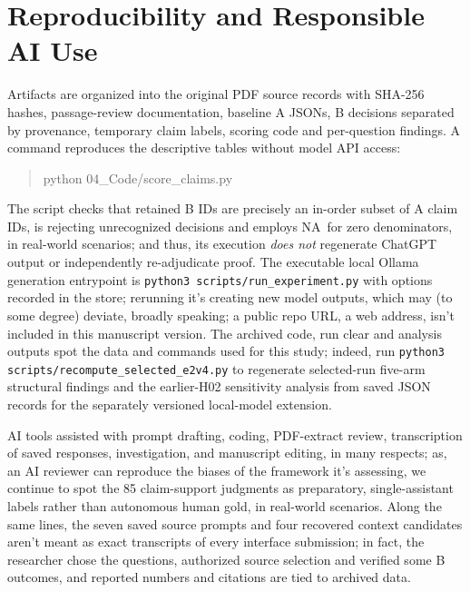 \documentclass[12pt,a4paper]{article}
\newcommand{\NA}{\textsc{NA}}
\begin{document}
\section{Reproducibility and Responsible AI Use}
Artifacts are organized into the original PDF source records with SHA-256 hashes, passage-review documentation, baseline A JSONs, B decisions separated by provenance, temporary claim labels, scoring code and per-question findings. A command reproduces the descriptive tables without model API access:
\begin{quote}\ttfamily\small python 04\_Code/score\_claims.py\end{quote}
The script checks that retained B IDs are precisely an in-order subset of A claim IDs, is rejecting unrecognized decisions and employs \NA\ for zero denominators, in real-world scenarios; and thus, its execution \emph{does not} regenerate ChatGPT output or independently re-adjudicate proof. The executable local Ollama generation entrypoint is \texttt{python3 scripts/run\_experiment.py} with options recorded in the store; rerunning it's creating new model outputs, which may (to some degree) deviate, broadly speaking; a public repo URL, a web address, isn't included in this manuscript version. The archived code, run clear and analysis outputs spot the data and commands used for this study; indeed, run \texttt{python3 scripts/recompute\_selected\_e2v4.py} to regenerate selected-run five-arm structural findings and the earlier-H02 sensitivity analysis from saved JSON records for the separately versioned local-model extension.

AI tools assisted with prompt drafting, coding, PDF-extract review, transcription of saved responses, investigation, and manuscript editing, in many respects; as, an AI reviewer can reproduce the biases of the framework it's assessing, we continue to spot the 85 claim-support judgments as preparatory, single-assistant labels rather than autonomous human gold, in real-world scenarios. Along the same lines, the seven saved source prompts and four recovered context candidates aren't meant as exact transcripts of every interface submission; in fact, the researcher chose the questions, authorized source selection and verified some B outcomes, and reported numbers and citations are tied to archived data.
\end{document}
